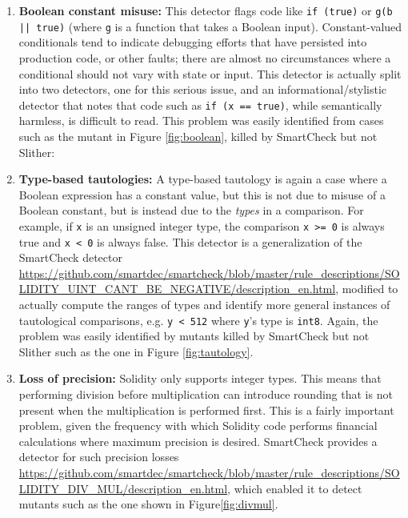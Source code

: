 \begin{enumerate}
\item {\bf Boolean constant misuse:}  This detector flags code like {\tt if (true)} or {\tt g(b || true)} (where {\tt g} is a function that takes a Boolean input).  Constant-valued conditionals tend to indicate debugging efforts that have persisted into production code, or other faults; there are almost no circumstances where a conditional should not vary with state or input.  This detector is actually split into two detectors, one for this serious issue, and an informational/stylistic detector that notes that code such as {\tt if (x == true)}, while semantically harmless, is difficult to read.  This problem was easily identified from cases such as the mutant in Figure \ref{fig:boolean}, killed by SmartCheck but not Slither:

\item {\bf Type-based tautologies:}  A type-based tautology is again a case where a Boolean expression has a constant value, but this is not due to misuse of a Boolean constant, but is instead due to the \emph{types} in a comparison.  For example, if {\tt x} is an unsigned integer type, the comparison {\tt x >= 0} is always true and {\tt x < 0} is always false.  This detector is a generalization of the SmartCheck detector \url{https://github.com/smartdec/smartcheck/blob/master/rule\_descriptions/SOLIDITY\_UINT\_CANT\_BE\_NEGATIVE/description\_en.html}, modified to actually compute the ranges of types and identify more general instances of tautological comparisons, e.g. {\tt y < 512} where {\tt y}'s type is {\tt int8}.  Again, the problem was easily identified by mutants killed by SmartCheck but not Slither such as the one in Figure \ref{fig:tautology}.

\item {\bf Loss of precision:}  Solidity only supports integer types.  This means that performing division before multiplication can introduce rounding that is not present when the multiplication is performed first.  This is a fairly important problem, given the frequency with which Solidity code performs financial calculations where maximum precision is desired.  SmartCheck provides a detector for such precision losses \url{https://github.com/smartdec/smartcheck/blob/master/rule\_descriptions/SOLIDITY\_DIV\_MUL/description\_en.html}, which enabled it to detect mutants such as the one shown in Figure\ref{fig:divmul}.
\end{enumerate}      

